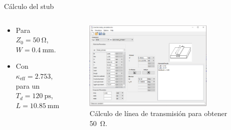 \documentclass{beamer}
\begin{document}
\begin{frame}{Cálculo del stub}

    \begin{columns}[c]
        \begin{block}{}
            \begin{itemize}
                \item Para $Z_0 = \qty{50}{\ohm}$, $W =
                    \qty{0.4}{\milli\meter}$.
                \item Con $\kappa_{\text{eff}} = 2.753$, para un $T_d =
                    \qty{120}{\pico\second}$, $L = \qty{10.85}{\milli\meter}$
            \end{itemize}
        \end{block}
        \begin{figure}[tbp]
            \centering
            \includegraphics[width=0.8\textwidth]{images/tline_width_calculation.png}
            \caption{Cálculo de línea de transmisión para obtener \qty{50}{\ohm}.}
        \end{figure}
    \end{columns}
\end{frame}
\end{document}
